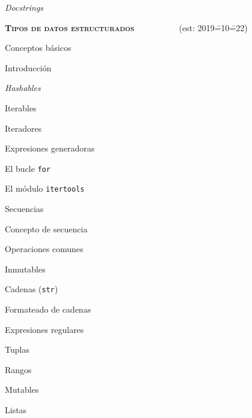 \begin{longenum}
\begin{longenum}
\begin{longenum}
            \item \textit{Docstrings}
        \end{longenum}
    \end{longenum}
    \item \textbf{\textsc{Tipos de datos estructurados}} \ \ \ \ \ \ \ \ \ \ (est: 2019\==10\==22)
    \begin{longenum}
        \item Conceptos básicos
        \begin{longenum}
            \item Introducción
            \item \textit{Hashables}
            \item Iterables
            \item Iteradores
            \begin{longenum}
                \item Expresiones generadoras
                \item El bucle \texttt{for}
                \item El módulo \texttt{itertools}
            \end{longenum}
        \end{longenum}
        \item Secuencias
        \begin{longenum}
            \item Concepto de secuencia
            \item Operaciones comunes
            \item Inmutables
            \begin{longenum}
                \item Cadenas (\texttt{str})
                \begin{longenum}
                    \item Formateado de cadenas
                    \item Expresiones regulares
                \end{longenum}
                \item Tuplas
                \item Rangos
            \end{longenum}
            \item Mutables
            \begin{longenum}
                \item Listas
            \end{longenum}

\end{longenum}
\end{longenum}
\end{longenum}
